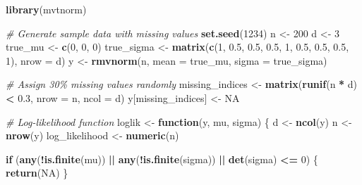 \documentclass[
]{article}
\newenvironment{Shaded}{\begin{snugshade}}{\end{snugshade}}
\newcommand{\AttributeTok}[1]{\textcolor[rgb]{0.13,0.29,0.53}{#1}}
\newcommand{\CommentTok}[1]{\textcolor[rgb]{0.56,0.35,0.01}{\textit{#1}}}
\newcommand{\ConstantTok}[1]{\textcolor[rgb]{0.56,0.35,0.01}{#1}}
\newcommand{\ControlFlowTok}[1]{\textcolor[rgb]{0.13,0.29,0.53}{\textbf{#1}}}
\newcommand{\DecValTok}[1]{\textcolor[rgb]{0.00,0.00,0.81}{#1}}
\newcommand{\FloatTok}[1]{\textcolor[rgb]{0.00,0.00,0.81}{#1}}
\newcommand{\FunctionTok}[1]{\textcolor[rgb]{0.13,0.29,0.53}{\textbf{#1}}}
\newcommand{\NormalTok}[1]{#1}
\newcommand{\OtherTok}[1]{\textcolor[rgb]{0.56,0.35,0.01}{#1}}
\newcommand{\SpecialCharTok}[1]{\textcolor[rgb]{0.81,0.36,0.00}{\textbf{#1}}}
\begin{document}
\begin{Shaded}
\begin{Highlighting}[]
\FunctionTok{library}\NormalTok{(mvtnorm)}

\CommentTok{\# Generate sample data with missing values}
\FunctionTok{set.seed}\NormalTok{(}\DecValTok{1234}\NormalTok{)}
\NormalTok{n }\OtherTok{\textless{}{-}} \DecValTok{200}
\NormalTok{d }\OtherTok{\textless{}{-}} \DecValTok{3}
\NormalTok{true\_mu }\OtherTok{\textless{}{-}} \FunctionTok{c}\NormalTok{(}\DecValTok{0}\NormalTok{, }\DecValTok{0}\NormalTok{, }\DecValTok{0}\NormalTok{)}
\NormalTok{true\_sigma }\OtherTok{\textless{}{-}} \FunctionTok{matrix}\NormalTok{(}\FunctionTok{c}\NormalTok{(}\DecValTok{1}\NormalTok{, }\FloatTok{0.5}\NormalTok{, }\FloatTok{0.5}\NormalTok{,}
                       \FloatTok{0.5}\NormalTok{, }\DecValTok{1}\NormalTok{, }\FloatTok{0.5}\NormalTok{,}
                       \FloatTok{0.5}\NormalTok{, }\FloatTok{0.5}\NormalTok{, }\DecValTok{1}\NormalTok{), }\AttributeTok{nrow =}\NormalTok{ d)}
\NormalTok{y }\OtherTok{\textless{}{-}} \FunctionTok{rmvnorm}\NormalTok{(n, }\AttributeTok{mean =}\NormalTok{ true\_mu, }\AttributeTok{sigma =}\NormalTok{ true\_sigma)}

\CommentTok{\# Assign 30\% missing values randomly}
\NormalTok{missing\_indices }\OtherTok{\textless{}{-}} \FunctionTok{matrix}\NormalTok{(}\FunctionTok{runif}\NormalTok{(n }\SpecialCharTok{*}\NormalTok{ d) }\SpecialCharTok{\textless{}} \FloatTok{0.3}\NormalTok{, }\AttributeTok{nrow =}\NormalTok{ n, }\AttributeTok{ncol =}\NormalTok{ d)}
\NormalTok{y[missing\_indices] }\OtherTok{\textless{}{-}} \ConstantTok{NA}

\CommentTok{\# Log{-}likelihood function}
\NormalTok{loglik }\OtherTok{\textless{}{-}} \ControlFlowTok{function}\NormalTok{(y, mu, sigma) \{}
\NormalTok{  d }\OtherTok{\textless{}{-}} \FunctionTok{ncol}\NormalTok{(y)}
\NormalTok{  n }\OtherTok{\textless{}{-}} \FunctionTok{nrow}\NormalTok{(y)}
\NormalTok{  log\_likelihood }\OtherTok{\textless{}{-}} \FunctionTok{numeric}\NormalTok{(n)}

  \ControlFlowTok{if}\NormalTok{ (}\FunctionTok{any}\NormalTok{(}\SpecialCharTok{!}\FunctionTok{is.finite}\NormalTok{(mu)) }\SpecialCharTok{||} \FunctionTok{any}\NormalTok{(}\SpecialCharTok{!}\FunctionTok{is.finite}\NormalTok{(sigma)) }\SpecialCharTok{||} \FunctionTok{det}\NormalTok{(sigma) }\SpecialCharTok{\textless{}=} \DecValTok{0}\NormalTok{) \{}
    \FunctionTok{return}\NormalTok{(}\ConstantTok{NA}\NormalTok{)}
\NormalTok{  \}}


\end{Highlighting}
\end{Shaded}
\end{document}
